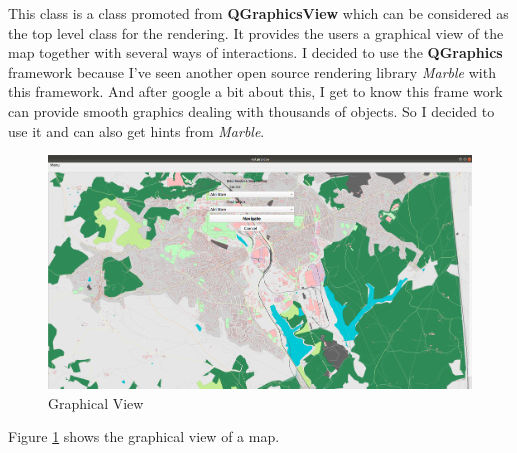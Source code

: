 \documentclass[a4paper, 12pt, english]{book}
\begin{document}
This class is a class promoted from {\textbf{QGraphicsView}} which can be considered as the top level class for the rendering. It provides the users a graphical view of the map together with several ways of interactions. I decided to use the {\textbf{QGraphics}} framework because I've seen another open source rendering library {\textit{Marble}} {\cite{Marble}} with this framework. And after google a bit about this, I get to know this frame work can provide smooth graphics dealing with thousands of objects. So I decided to use it and can also get hints from {\textit{Marble}}.

\begin{figure}
	\includegraphics[width=\linewidth]{./img/rendering.png}
	\caption{Graphical View}
	\label{fig:rendering}
\end{figure}

Figure \ref{fig:rendering} shows the graphical view of a map.\\
\end{document}
